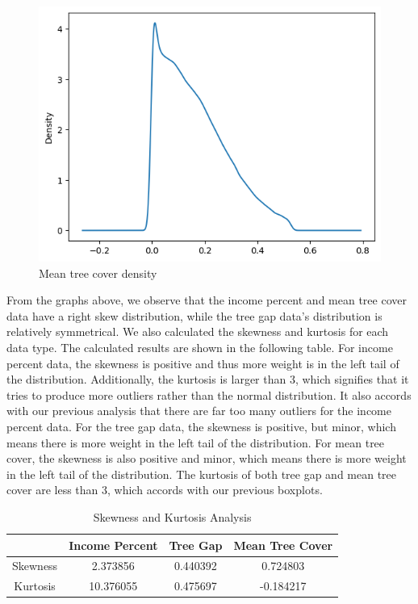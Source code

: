 \documentclass{article}
\begin{document}
\begin{figure}[H]
    \centering
    \includegraphics[scale = 0.4]{mean_percent_cover_density.png}
    \caption{Mean tree cover density}
    \label{fig:my_label}
\end{figure}

From the graphs above, we observe that the income percent and mean tree cover data have a right skew distribution, while the tree gap data’s distribution is relatively symmetrical. We also calculated the skewness and kurtosis for each data type. The calculated results are shown in the following table. For income percent data, the skewness is positive and thus more weight is in the left tail of the distribution. Additionally, the kurtosis is larger than 3, which signifies that it tries to produce more outliers rather than the normal distribution. It also accords with our previous analysis that there are far too many outliers for the income percent data. For the tree gap data, the skewness is positive, but minor, which means there is more weight in the left tail of the distribution. For mean tree cover, the skewness is also positive and minor, which means there is more weight in the left tail of the distribution. The kurtosis of both tree gap and mean tree cover are less than 3, which accords with our previous boxplots. 



\begin{table}[h!]
\centering
\begin{tabular}{|c |c c c|} 
 \hline
  & Income Percent & Tree Gap & Mean Tree Cover \\ [0.5ex] 
 \hline
 Skewness & 2.373856 & 0.440392 & 0.724803 \\ 
 Kurtosis & 10.376055 & 0.475697 & -0.184217 \\
 \hline
\end{tabular}
\caption{Skewness and Kurtosis Analysis}
\label{table:1}
\end{table}
\end{document}
